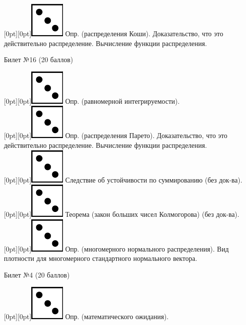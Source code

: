\documentclass[10pt]{article}
\begin{document}
\raisebox{-1pt}[0pt][0pt]{\includegraphics[width=0.02\linewidth]{3.png}} Опр. (распределения Коши). Доказательство, что это действительно распределение. Вычисление функции распределения. \\

\begin{center} {\Large Билет №16 (20 баллов)} \end{center}

\raisebox{-1pt}[0pt][0pt]{\includegraphics[width=0.02\linewidth]{3.png}} Опр. (равномерной интегрируемости). \\

\raisebox{-1pt}[0pt][0pt]{\includegraphics[width=0.02\linewidth]{3.png}} Опр. (распределения Парето). Доказательство, что это действительно распределение. Вычисление функции распределения. \\

\raisebox{-1pt}[0pt][0pt]{\includegraphics[width=0.02\linewidth]{3.png}} Следствие об устойчивости по суммированию (без док-ва). \\

\raisebox{-1pt}[0pt][0pt]{\includegraphics[width=0.02\linewidth]{3.png}} Теорема (закон больших чисел Колмогорова) (без док-ва). \\

\raisebox{-1pt}[0pt][0pt]{\includegraphics[width=0.02\linewidth]{3.png}} Опр. (многомерного нормального распределения). Вид плотности для многомерного стандартного нормального вектора. \\ 

\begin{center} {\Large Билет №4 (20 баллов)} \end{center}

\raisebox{-1pt}[0pt][0pt]{\includegraphics[width=0.02\linewidth]{3.png}} Опр. (математического ожидания). \\
\end{document}
